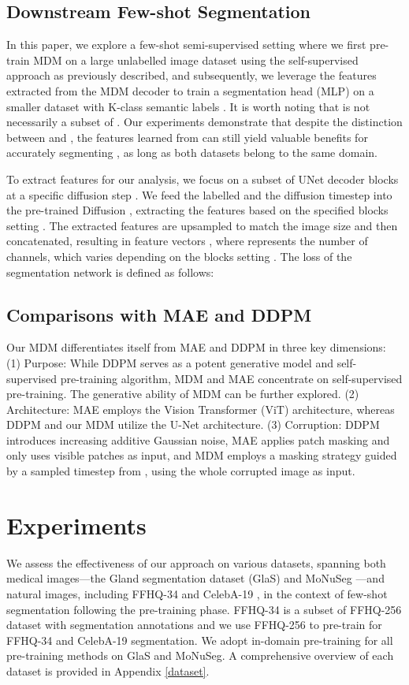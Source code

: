 \documentclass{article} \usepackage{iclr2024_conference,times}
\begin{document}
\subsection{Downstream Few-shot Segmentation}
In this paper, we explore a few-shot semi-supervised setting where we first pre-train MDM on a large unlabelled image dataset  using the self-supervised approach as previously described, and subsequently, we  leverage the features extracted from the MDM decoder to train a segmentation head  (MLP) on a smaller dataset  with K-class semantic labels . 
It is worth noting that  is not necessarily a subset of . Our experiments demonstrate that despite the distinction between  and , the features learned from  can still yield valuable benefits for accurately segmenting , as long as both datasets belong to the same domain. 

To extract features for our analysis, we focus on a subset of UNet decoder blocks at a specific diffusion step . We feed the labelled  and the diffusion timestep  into the pre-trained Diffusion , extracting the features based on the specified blocks setting .
The extracted features are upsampled to match the image size and then concatenated, resulting in feature vectors , where  represents the number of channels, which varies depending on the blocks setting . The loss of the segmentation network  is defined as follows:


\subsection{Comparisons with MAE and DDPM}
Our MDM differentiates itself from MAE and DDPM in three key dimensions: (1) Purpose: While DDPM serves as a potent generative model and self-supervised pre-training algorithm, MDM and MAE concentrate on self-supervised pre-training. The generative ability of MDM can be further explored. (2) Architecture: MAE employs the Vision Transformer (ViT) architecture, whereas DDPM and our MDM utilize the U-Net architecture. (3) Corruption: DDPM introduces increasing additive Gaussian noise, MAE applies patch masking and only uses visible patches as input, and MDM employs a masking strategy guided by a sampled timestep  from , using the whole corrupted image as input.

\section{Experiments}
We assess the effectiveness of our approach on various datasets, spanning both medical images—the Gland segmentation dataset (GlaS) \citep{DBLP:journals/mia/Sirinukunwattana17} and MoNuSeg \citep{DBLP:journals/tmi/KumarVSBVS17,DBLP:journals/tmi/KumarVAZOTCHLHW20}—and natural images, including FFHQ-34 and CelebA-19 \citep{DBLP:conf/iclr/BaranchukVRKB22}, in the context of few-shot segmentation following the pre-training phase.
FFHQ-34 is a subset of FFHQ-256 dataset \citep{DBLP:conf/cvpr/KarrasLA19} with segmentation annotations and we use FFHQ-256 to pre-train for FFHQ-34 and CelebA-19 segmentation. We adopt in-domain pre-training for all pre-training methods on GlaS and MoNuSeg. A comprehensive overview of each dataset is provided in Appendix \ref{dataset}.
\end{document}
